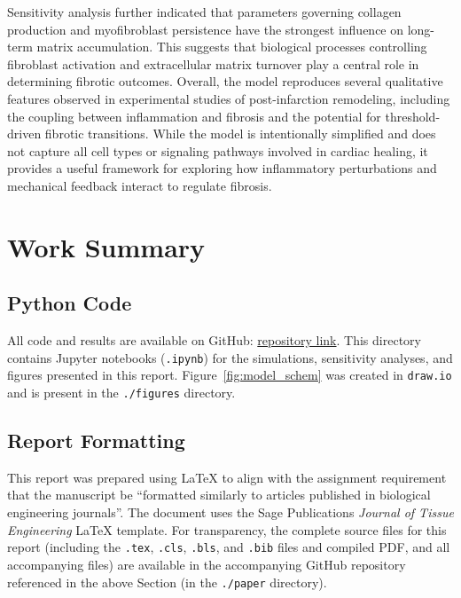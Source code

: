 \documentclass[Afour,sageh,times]{sagej}
\begin{document}
Sensitivity analysis further indicated that parameters governing collagen production and myofibroblast persistence have the strongest influence on long-term matrix accumulation. This suggests that biological processes controlling fibroblast activation and extracellular matrix turnover play a central role in determining fibrotic outcomes. Overall, the model reproduces several qualitative features observed in experimental studies of post-infarction remodeling, including the coupling between inflammation and fibrosis and the potential for threshold-driven fibrotic transitions. While the model is intentionally simplified and does not capture all cell types or signaling pathways involved in cardiac healing, it provides a useful framework for exploring how inflammatory perturbations and mechanical feedback interact to regulate fibrosis.




\appendix

\section{Work Summary}
\label{sec:work}

\subsection{Python Code}\label{sec:code}

All code and results are available on GitHub:
\href{https://github.com/caterer-z-t/CHEN_5150/tree/main/Midterm}{repository link}. 
This directory contains Jupyter notebooks (\texttt{.ipynb}) for the simulations, sensitivity analyses, and figures presented in this report. Figure~\ref{fig:model_schem} was created in \texttt{draw.io} and is present in the \texttt{./figures} directory. 

\subsection{Report Formatting}
\label{sec:tex}

This report was prepared using \LaTeX{} to align with the assignment requirement that the manuscript be ``formatted similarly to articles published in biological engineering journals''. The document uses the Sage Publications \textit{Journal of Tissue Engineering} \LaTeX{} template. For transparency, the complete source files for this report (including the \texttt{.tex}, \texttt{.cls}, \texttt{.bls}, and \texttt{.bib} files and compiled PDF, and all accompanying files) are available in the accompanying GitHub repository referenced in the above Section (in the \texttt{./paper} directory).
\end{document}
